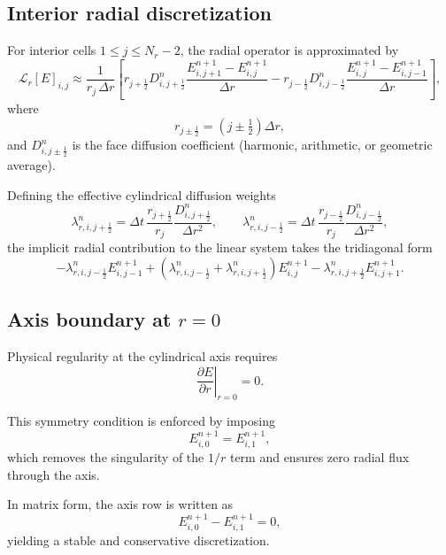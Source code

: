 \documentclass[11pt]{article}
\begin{document}
\subsection{Interior radial discretization}

For interior cells $1 \le j \le N_r-2$, the radial operator is approximated by
\begin{equation}
\mathcal{L}_r[E]_{i,j}
\approx
\frac{1}{r_j\,\Delta r}
\left[
r_{j+\frac12} D^n_{i,j+\frac12}
\frac{E^{n+1}_{i,j+1}-E^{n+1}_{i,j}}{\Delta r}
-
r_{j-\frac12} D^n_{i,j-\frac12}
\frac{E^{n+1}_{i,j}-E^{n+1}_{i,j-1}}{\Delta r}
\right],
\end{equation}
where
\[
r_{j\pm\frac12} = \left(j \pm \tfrac12\right)\Delta r,
\]
and $D^n_{i,j\pm\frac12}$ is the face diffusion coefficient (harmonic, arithmetic,
or geometric average).

Defining the effective cylindrical diffusion weights
\begin{equation}
\lambda^n_{r,i,j+\frac12}
=
\Delta t\,
\frac{r_{j+\frac12}}{r_j}
\frac{D^n_{i,j+\frac12}}{\Delta r^2},
\qquad
\lambda^n_{r,i,j-\frac12}
=
\Delta t\,
\frac{r_{j-\frac12}}{r_j}
\frac{D^n_{i,j-\frac12}}{\Delta r^2},
\end{equation}
the implicit radial contribution to the linear system takes the tridiagonal form
\begin{equation}
-\lambda^n_{r,i,j-\frac12} E^{n+1}_{i,j-1}
+
\left(
\lambda^n_{r,i,j-\frac12}
+
\lambda^n_{r,i,j+\frac12}
\right) E^{n+1}_{i,j}
-
\lambda^n_{r,i,j+\frac12} E^{n+1}_{i,j+1}.
\end{equation}

\subsection{Axis boundary at $r=0$}

Physical regularity at the cylindrical axis requires
\begin{equation}
\left.\frac{\partial E}{\partial r}\right|_{r=0} = 0.
\end{equation}

This symmetry condition is enforced by imposing
\begin{equation}
E_{i,0}^{n+1} = E_{i,1}^{n+1},
\end{equation}
which removes the singularity of the $1/r$ term and ensures zero radial flux
through the axis.

In matrix form, the axis row is written as
\[
E_{i,0}^{n+1} - E_{i,1}^{n+1} = 0,
\]
yielding a stable and conservative discretization.
\end{document}
